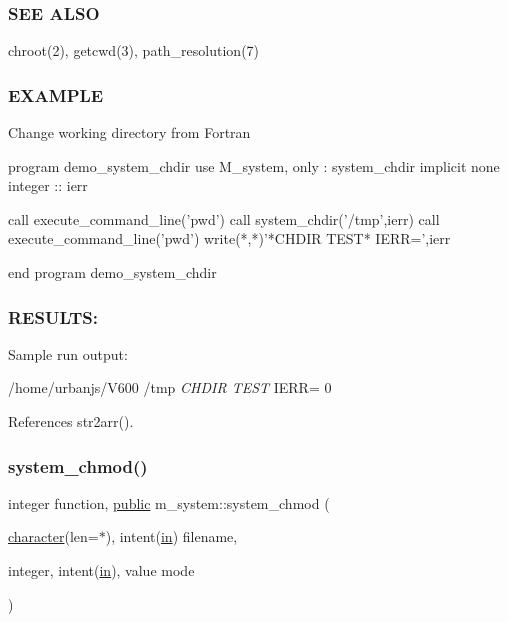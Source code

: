 \subsubsection*{S\+EE A\+L\+SO}

\begin{DoxyVerb}chroot(2), getcwd(3), path_resolution(7)
\end{DoxyVerb}


\subsubsection*{E\+X\+A\+M\+P\+LE}

\begin{DoxyVerb}Change working directory from Fortran

  program demo_system_chdir
  use M_system, only : system_chdir
  implicit none
  integer :: ierr

  call execute_command_line('pwd')
  call system_chdir('/tmp',ierr)
  call execute_command_line('pwd')
  write(*,*)'*CHDIR TEST* IERR=',ierr

  end program demo_system_chdir
\end{DoxyVerb}


\subsubsection*{R\+E\+S\+U\+L\+TS\+:}

Sample run output\+:

/home/urbanjs/\+V600 /tmp {\itshape C\+H\+D\+IR T\+E\+ST} I\+E\+RR= 0 

References str2arr().

\mbox{\label{namespacem__system_ace9ce0c8a9c8341a76b8903cd2390ce3}} 
\subsubsection{\texorpdfstring{system\+\_\+chmod()}{system\_chmod()}}
{\footnotesize\ttfamily integer function, \hyperlink{M__stopwatch_83_8txt_a2f74811300c361e53b430611a7d1769f}{public} m\+\_\+system\+::system\+\_\+chmod (\begin{DoxyParamCaption}\item[{\hyperlink{option__stopwatch_83_8txt_abd4b21fbbd175834027b5224bfe97e66}{character}(len=$\ast$), intent(\hyperlink{M__journal_83_8txt_afce72651d1eed785a2132bee863b2f38}{in})}]{filename,  }\item[{integer, intent(\hyperlink{M__journal_83_8txt_afce72651d1eed785a2132bee863b2f38}{in}), value}]{mode }\end{DoxyParamCaption})}



